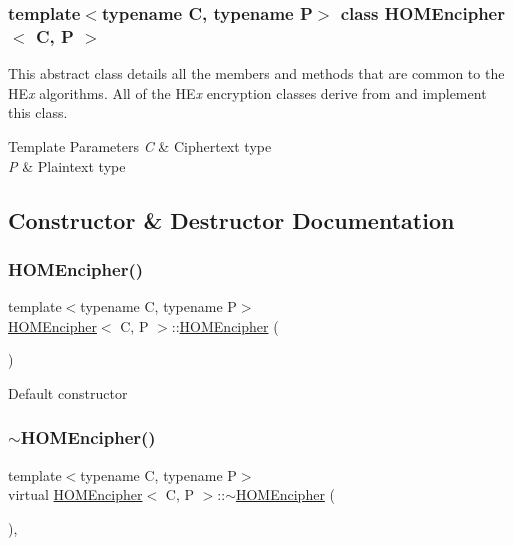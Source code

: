 \subsubsection*{template$<$typename C, typename P$>$\newline
class H\+O\+M\+Encipher$<$ C, P $>$}

This abstract class details all the members and methods that are common to the HE{\itshape x} algorithms. All of the HE{\itshape x} encryption classes derive from and implement this class. 
\begin{DoxyTemplParams}{Template Parameters}
{\em C} & Ciphertext type \\
\hline
{\em P} & Plaintext type \\
\hline
\end{DoxyTemplParams}


\subsection{Constructor \& Destructor Documentation}
\mbox{\label{classHOMEncipher_a08c76156f4f64433ead6ed2a1f142ffe}} 
\subsubsection{\texorpdfstring{H\+O\+M\+Encipher()}{HOMEncipher()}}
{\footnotesize\ttfamily template$<$typename C, typename P$>$ \\
\hyperlink{classHOMEncipher}{H\+O\+M\+Encipher}$<$ C, P $>$\+::\hyperlink{classHOMEncipher}{H\+O\+M\+Encipher} (\begin{DoxyParamCaption}{ }\end{DoxyParamCaption})\hspace{0.3cm}{\ttfamily [inline]}}

Default constructor \mbox{\label{classHOMEncipher_a93b5c48425b0ac327757795703ecd2d7}} 
\subsubsection{\texorpdfstring{$\sim$\+H\+O\+M\+Encipher()}{~HOMEncipher()}}
{\footnotesize\ttfamily template$<$typename C, typename P$>$ \\
virtual \hyperlink{classHOMEncipher}{H\+O\+M\+Encipher}$<$ C, P $>$\+::$\sim$\hyperlink{classHOMEncipher}{H\+O\+M\+Encipher} (\begin{DoxyParamCaption}{ }\end{DoxyParamCaption})\hspace{0.3cm}{\ttfamily [inline]}, {\ttfamily [virtual]}}

